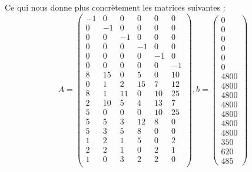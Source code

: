 Ce qui nous donne plus concrètement les matrices suivantes :
\[
A =
\begin{pmatrix}
   -1 &    0 &    0 &    0 &    0 &    0 \\
    0 &   -1 &    0 &    0 &    0 &    0 \\
    0 &    0 &   -1 &    0 &    0 &    0 \\
    0 &    0 &    0 &   -1 &    0 &    0 \\
    0 &    0 &    0 &    0 &   -1 &    0 \\
    0 &    0 &    0 &    0 &    0 &   -1 \\
\hline
    8 &   15 &    0 &    5 &    0 &   10 \\
    0 &    1 &    2 &   15 &    7 &   12 \\
    8 &    1 &   11 &    0 &   10 &   25 \\
    2 &   10 &    5 &    4 &   13 &    7 \\
    5 &    0 &    0 &    0 &   10 &   25 \\
    5 &    5 &    3 &   12 &    8 &    0 \\
    5 &    3 &    5 &    8 &    0 &    0 \\
\hline
    1 &    2 &    1 &    5 &    0 &    2 \\
    2 &    2 &    1 &    0 &    2 &    1 \\
    1 &    0 &    3 &    2 &    2 &    0 \\
\end{pmatrix}
, b = 
\begin{pmatrix}
0 \\ 0 \\ 0 \\ 0 \\ 0 \\ 0 \\
\hline
4800 \\ 4800 \\ 4800 \\ 4800 \\ 4800 \\ 4800 \\ 4800 \\
\hline
350 \\ 620 \\ 485
\end{pmatrix}
\]





